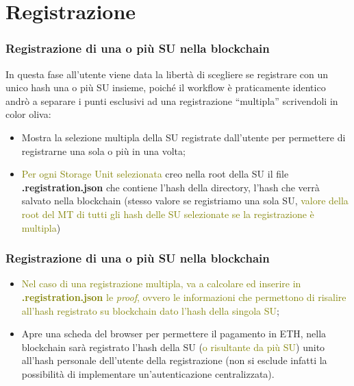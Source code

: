 \documentclass{beamer}
\begin{document}
\section{Registrazione}
\begin{frame}
	\frametitle{Registrazione di una o più SU nella blockchain}
	In questa fase all'utente viene data la libertà di scegliere se registrare con un unico hash una o più SU insieme, poiché il workflow è praticamente identico andrò a separare i punti esclusivi ad una registrazione “multipla” scrivendoli in color oliva:
	\begin{itemize}
		\item Mostra la selezione multipla della SU registrate dall'utente per permettere di registrarne una sola o più in una volta;
		\item \textcolor{olive}{Per ogni Storage Unit selezionata} creo nella root della SU il file \textbf{.registration.json} che contiene l'hash della directory, l'hash che verrà salvato nella blockchain (stesso valore se registriamo una sola SU, \textcolor{olive}{valore della root del MT di tutti gli hash delle SU selezionate se la registrazione è multipla})
	\end{itemize}
\end{frame}
\begin{frame}
	\frametitle{Registrazione di una o più SU nella blockchain}
	\begin{itemize}
		\item \textcolor{olive}{Nel caso di una registrazione multipla, va a calcolare ed inserire in \textbf{.registration.json} le \emph{proof}, ovvero le informazioni che permettono di risalire all'hash registrato su blockchain dato l'hash della singola SU};
		\item Apre una scheda del browser per permettere il pagamento in ETH, nella blockchain sarà registrato l'hash della SU (\textcolor{olive}{o risultante da più SU}) unito all'hash personale dell'utente della registrazione (non si esclude infatti la possibilità di implementare un'autenticazione centralizzata).
	\end{itemize}
\end{frame}
\end{document}
